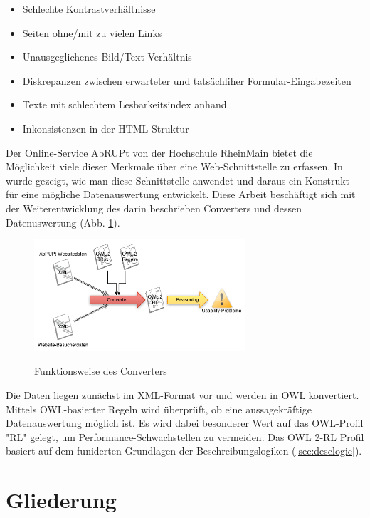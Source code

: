 \documentclass[runningheads,a4paper]{llncs}
\begin{document}
\begin{itemize}
\item{Schlechte Kontrastverhältnisse}
\item{Seiten ohne/mit zu vielen Links}
\item{Unausgeglichenes Bild/Text-Verhältnis}
\item{Diskrepanzen zwischen erwarteter und tatsächliher Formular-Eingabezeiten}
\item{Texte mit schlechtem Lesbarkeitsindex anhand \cite{lesbarkeit}}
\item{Inkonsistenzen in der HTML-Struktur}
\end{itemize}

Der Online-Service AbRUPt \cite{abrupt} von der Hochschule RheinMain bietet die Möglichkeit viele dieser Merkmale über eine Web-Schnittstelle zu erfassen. 
In \cite{Brieger} wurde gezeigt, wie man diese Schnittstelle anwendet und daraus ein Konstrukt für eine mögliche Datenauswertung entwickelt.
Diese Arbeit beschäftigt sich mit der Weiterentwicklung des darin beschrieben Converters und dessen Datenuswertung (Abb. \ref{fig:converter}).

\begin{figure}
\caption{Funktionsweise des Converters}
\centering
\includegraphics[width=0.7\textwidth]{figures/converter}
\label{fig:converter}
\end{figure}

Die Daten liegen zunächst im XML-Format vor und werden in OWL konvertiert.
Mittels OWL-basierter Regeln wird überprüft, ob eine aussagekräftige Datenauswertung möglich ist.
Es wird dabei besonderer Wert auf das OWL-Profil {}"RL{}" gelegt, um Performance-Schwachstellen zu vermeiden.
Das OWL 2-RL Profil basiert auf dem funiderten Grundlagen der Beschreibungslogiken (\ref{sec:desclogic}).

\section{Gliederung}
\label{sec:structure}
\end{document}
